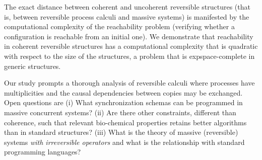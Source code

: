 \documentclass{mecbic}
\begin{document}
The exact distance between coherent and uncoherent
reversible structures (that is, between reversible process calculi and
massive systems) is manifested by the computational complexity of the
reachability problem (verifying whether a configuration is reachable from
an initial one).
We demonstrate that reachability in coherent
reversible structures has a
computational complexity that is quadratic with respect to the size of
the structures, a problem that is {\sc expspace}-complete in generic structures.

Our study prompts a thorough analysis of reversible
calculi where processes have multiplicities and the causal dependencies
between copies may be exchanged. Open questions are (i)
What synchronization schemas can be  programmed in massive concurrent
systems? (ii) Are there other constraints, different than coherence,
such that relevant bio-chemical properties retains better algorithms
than in standard structures? (iii) What is the theory of
 massive (reversible)
systems {\it with irreversible operators} and what is the relationship with
standard programming languages?
\end{document}
